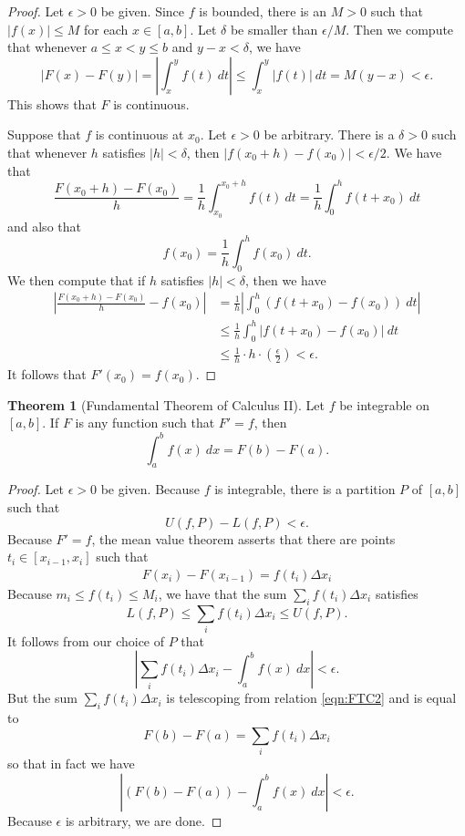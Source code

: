 \documentclass[12pt]{article}
\theoremstyle{definition}
\theoremstyle{theorem}
\newtheorem{theorem}[definition]{Theorem}
\begin{document}
\begin{proof}
Let $\epsilon > 0$ be given. Since $f$ is bounded, there is an $M > 0$ such that $|f(x)| \leqslant M$ for each $x \in [a,b]$. Let $\delta$ be smaller than $\epsilon/M$. Then we compute that whenever $a \leqslant x < y \leqslant b$ and $y - x < \delta$, we have 
\[
\left|F(x) - F(y)\right| = \left|\int_{x}^y f(t) \: dt \right| \leqslant \int_x^y|f(t)| \: dt = M(y-x) < \epsilon.
\]
This shows that $F$ is continuous. 

Suppose that $f$ is continuous at $x_0$. Let $\epsilon > 0$ be arbitrary. There is a $\delta > 0$ such that whenever $h$ satisfies $|h| < \delta$, then $|f(x_0 + h) - f(x_0)| < \epsilon/2$. We have that 
\[
\frac{F(x_0 + h) - F(x_0)}{h}  = \frac{1}{h} \int_{x_0}^{x_0 + h} f(t)\: dt= \frac{1}{h} \int_0^h f(t + x_0) \:dt  
\]
and also that 
\[
f(x_0) = \frac{1}{h} \int_0^h f(x_0) \: dt.
\]
We then compute that if $h$ satisfies $|h| < \delta$, then we have  
\begin{align*}
\left|\frac{F(x_0 + h) - F(x_0)}{h} - f(x_0)\right| &= \frac{1}{h} \left|\int_{0}^{h} (f(t + x_0) - f(x_0))\: dt\right| \\
&\leqslant \frac{1}{h} \int_{0}^{h} |f(t + x_0) - f(x_0)| \: dt \\
&\leqslant \frac{1}{h} \cdot h \cdot \left(\frac{\epsilon}{2}\right) < \epsilon.
\end{align*}
It follows that $F'(x_0) = f(x_0)$. 
\end{proof}

\begin{theorem}[Fundamental Theorem of Calculus II]
Let $f$ be integrable on $[a,b]$. If $F$ is any function such that $F' = f$, then 
\[
\int_a^b f(x) \: dx = F(b) - F(a).
\]
\end{theorem}

\begin{proof}
Let $\epsilon > 0$ be given. Because $f$ is integrable, there is a partition $P$ of $[a,b]$ such that 
\[
U(f,P) - L(f,P) < \epsilon.
\]
Because $F' = f$, the mean value theorem asserts that there are points $t_i \in [x_{i-1},x_i]$ such that 
\begin{align}\label{eqn:FTC2}
F(x_i) - F(x_{i-1}) = f(t_i) \Delta x_i
\end{align}
Because $m_i \leqslant f(t_i) \leqslant M_i$, we have that the sum $\sum_i f(t_i) \Delta x_i$ satisfies 
\[
L(f,P) \leqslant \sum_{i}f(t_i) \Delta x_i \leqslant U(f,P).
\] 
It follows from our choice of $P$ that  
\[
\left|\sum_{i} f(t_i) \Delta x_i - \int_a^b f(x) \: dx \right| < \epsilon.
\]
But the sum $\sum_i f(t_i)\Delta x_i$ is telescoping from relation \eqref{eqn:FTC2} and is equal to 
\[
F(b) - F(a) = \sum_i f(t_i) \Delta x_i
\]
so that in fact we have 
\[
\left|(F(b) - F(a)) - \int_a^b f(x) \: dx \right| < \epsilon.
\]
Because $\epsilon$ is arbitrary, we are done. 
\end{proof}
\end{document}
